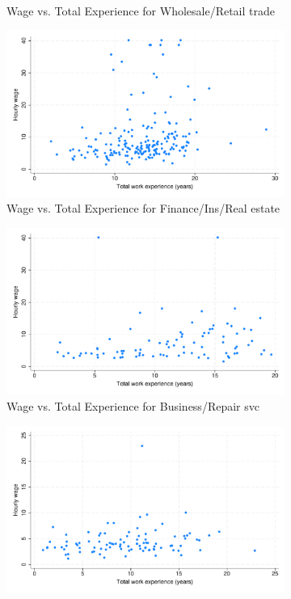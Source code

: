 \documentclass{article}
\begin{document}
\begin{figure}[H]
\begin{subfigure}{.3\textwidth}
  \caption{Wage vs. Total Experience for Wholesale/Retail trade}
\end{subfigure}
\begin{subfigure}{.3\textwidth}
  \includegraphics[width = 1.00\textwidth]{./figures/scatter_wage_ind7.pdf}  
  \caption{Wage vs. Total Experience for Finance/Ins/Real estate}
\end{subfigure}
\begin{subfigure}{.3\textwidth}
  \includegraphics[width = 1.00\textwidth]{./figures/scatter_wage_ind8.pdf}  
  \caption{Wage vs. Total Experience for Business/Repair svc}
\end{subfigure}
\begin{subfigure}{.3\textwidth}
  \includegraphics[width = 1.00\textwidth]{./figures/scatter_wage_ind9.pdf}  

\end{subfigure}
\end{figure}
\end{document}
